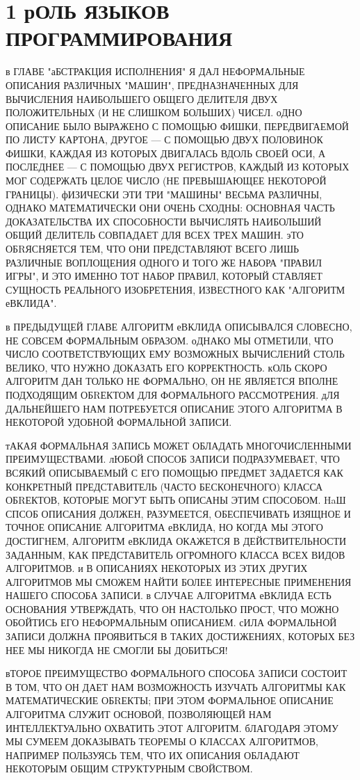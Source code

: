
\chapter{1 рОЛЬ ЯЗЫКОВ ПРОГРАММИРОВАНИЯ}

в ГЛАВЕ "аБСТРАКЦИЯ ИСПОЛНЕНИЯ" Я ДАЛ НЕФОРМАЛЬНЫЕ
ОПИСАНИЯ РАЗЛИЧНЫХ "МАШИН", ПРЕДНАЗНАЧЕННЫХ ДЛЯ
ВЫЧИСЛЕНИЯ НАИБОЛЬШЕГО ОБЩЕГО ДЕЛИТЕЛЯ ДВУХ
ПОЛОЖИТЕЛЬНЫХ (И НЕ СЛИШКОМ БОЛЬШИХ) ЧИСЕЛ. оДНО
ОПИСАНИЕ БЫЛО ВЫРАЖЕНО С ПОМОЩЬЮ ФИШКИ,
ПЕРЕДВИГАЕМОЙ ПО ЛИСТУ КАРТОНА, ДРУГОЕ --- С
ПОМОЩЬЮ ДВУХ ПОЛОВИНОК ФИШКИ, КАЖДАЯ ИЗ КОТОРЫХ
ДВИГАЛАСЬ ВДОЛЬ СВОЕЙ ОСИ,  А ПОСЛЕДНЕЕ --- С
ПОМОЩЬЮ ДВУХ РЕГИСТРОВ, КАЖДЫЙ ИЗ КОТОРЫХ МОГ
СОДЕРЖАТЬ ЦЕЛОЕ  ЧИСЛО (НЕ ПРЕВЫШАЮЩЕЕ НЕКОТОРОЙ
ГРАНИЦЫ). фИЗИЧЕСКИ ЭТИ ТРИ "МАШИНЫ" ВЕСЬМА
РАЗЛИЧНЫ, ОДНАКО МАТЕМАТИЧЕСКИ ОНИ ОЧЕНЬ СХОДНЫ:
ОСНОВНАЯ ЧАСТЬ  ДОКАЗАТЕЛЬСТВА ИХ СПОСОБНОСТИ
ВЫЧИСЛЯТЬ НАИБОЛЬШИЙ ОБЩИЙ  ДЕЛИТЕЛЬ СОВПАДАЕТ ДЛЯ
ВСЕХ ТРЕХ МАШИН. эТО ОБRЯСНЯЕТСЯ ТЕМ, ЧТО ОНИ
ПРЕДСТАВЛЯЮТ ВСЕГО ЛИШЬ РАЗЛИЧНЫЕ ВОПЛОЩЕНИЯ ОДНОГО
И ТОГО ЖЕ НАБОРА "ПРАВИЛ ИГРЫ", И ЭТО ИМЕННО ТОТ
НАБОР ПРАВИЛ, КОТОРЫЙ СТАВЛЯЕТ СУЩНОСТЬ РЕАЛЬНОГО
ИЗОБРЕТЕНИЯ, ИЗВЕСТНОГО КАК "АЛГОРИТМ еВКЛИДА".

в ПРЕДЫДУЩЕЙ ГЛАВЕ АЛГОРИТМ еВКЛИДА ОПИСЫВАЛСЯ
СЛОВЕСНО, НЕ СОВСЕМ ФОРМАЛЬНЫМ ОБРАЗОМ. оДНАКО МЫ
ОТМЕТИЛИ, ЧТО ЧИСЛО СООТВЕТСТВУЮЩИХ ЕМУ ВОЗМОЖНЫХ
ВЫЧИСЛЕНИЙ СТОЛЬ ВЕЛИКО, ЧТО НУЖНО ДОКАЗАТЬ ЕГО
КОРРЕКТНОСТЬ. кОЛЬ СКОРО АЛГОРИТМ ДАН ТОЛЬКО НЕ
ФОРМАЛЬНО, ОН НЕ ЯВЛЯЕТСЯ ВПОЛНЕ ПОДХОДЯЩИМ
ОБRЕКТОМ ДЛЯ ФОРМАЛЬНОГО РАССМОТРЕНИЯ. дЛЯ
ДАЛЬНЕЙШЕГО НАМ ПОТРЕБУЕТСЯ ОПИСАНИЕ ЭТОГО
АЛГОРИТМА В  НЕКОТОРОЙ УДОБНОЙ ФОРМАЛЬНОЙ ЗАПИСИ.

тАКАЯ ФОРМАЛЬНАЯ ЗАПИСЬ МОЖЕТ ОБЛАДАТЬ МНОГОЧИСЛЕННЫМИ
ПРЕИМУЩЕСТВАМИ. лЮБОЙ СПОСОБ ЗАПИСИ ПОДРАЗУМЕВАЕТ,
ЧТО ВСЯКИЙ ОПИСЫВАЕМЫЙ С ЕГО ПОМОЩЬЮ ПРЕДМЕТ
ЗАДАЕТСЯ КАК КОНКРЕТНЫЙ ПРЕДСТАВИТЕЛЬ (ЧАСТО
БЕСКОНЕЧНОГО) КЛАССА  ОБRЕКТОВ, КОТОРЫЕ МОГУТ БЫТЬ
ОПИСАНЫ ЭТИМ СПОСОБОМ. HaШ СПСОБ ОПИСАНИЯ ДОЛЖЕН,
РАЗУМЕЕТСЯ, ОБЕСПЕЧИВАТЬ ИЗЯЩНОЕ И ТОЧНОЕ ОПИСАНИЕ
АЛГОРИТМА еВКЛИДА, НО КОГДА МЫ ЭТОГО ДОСТИГНЕМ,
АЛГОРИТМ еВКЛИДА ОКАЖЕТСЯ В ДЕЙСТВИТЕЛЬНОСТИ
ЗАДАННЫМ, КАК ПРЕДСТАВИТЕЛЬ ОГРОМНОГО КЛАССА ВСЕХ
ВИДОВ АЛГОРИТМОВ. и В ОПИСАНИЯХ НЕКОТОРЫХ ИЗ ЭТИХ
ДРУГИХ АЛГОРИТМОВ МЫ СМОЖЕМ НАЙТИ БОЛЕЕ ИНТЕРЕСНЫЕ
ПРИМЕНЕНИЯ НАШЕГО СПОСОБА ЗАПИСИ. в СЛУЧАЕ
АЛГОРИТМА еВКЛИДА ЕСТЬ ОСНОВАНИЯ УТВЕРЖДАТЬ, ЧТО ОН
НАСТОЛЬКО ПРОСТ, ЧТО МОЖНО ОБОЙТИСЬ ЕГО
НЕФОРМАЛЬНЫМ ОПИСАНИЕМ. сИЛА ФОРМАЛЬНОЙ ЗАПИСИ
ДОЛЖНА ПРОЯВИТЬСЯ В ТАКИХ ДОСТИЖЕНИЯХ, КОТОРЫХ БЕЗ
НЕЕ МЫ НИКОГДА НЕ СМОГЛИ БЫ ДОБИТЬСЯ!

вТОРОЕ ПРЕИМУЩЕСТВО ФОРМАЛЬНОГО СПОСОБА ЗАПИСИ СОСТОИТ В
ТОМ, ЧТО ОН ДАЕТ НАМ ВОЗМОЖНОСТЬ ИЗУЧАТЬ АЛГОРИТМЫ
КАК МАТЕМАТИЧЕСКИЕ ОБRЕКТЫ; ПРИ ЭТОМ ФОРМАЛЬНОЕ
ОПИСАНИЕ АЛГОРИТМА СЛУЖИТ ОСНОВОЙ, ПОЗВОЛЯЮЩЕЙ НАМ
ИНТЕЛЛЕКТУАЛЬНО ОХВАТИТЬ ЭТОТ АЛГОРИТМ. бЛАГОДАРЯ
ЭТОМУ МЫ СУМЕЕМ ДОКАЗЫВАТЬ ТЕОРЕМЫ О КЛАССАХ
АЛГОРИТМОВ, НАПРИМЕР ПОЛЬЗУЯСЬ ТЕМ, ЧТО ИХ ОПИСАНИЯ
ОБЛАДАЮТ НЕКОТОРЫМ ОБЩИМ СТРУКТУРНЫМ СВОЙСТВОМ.

